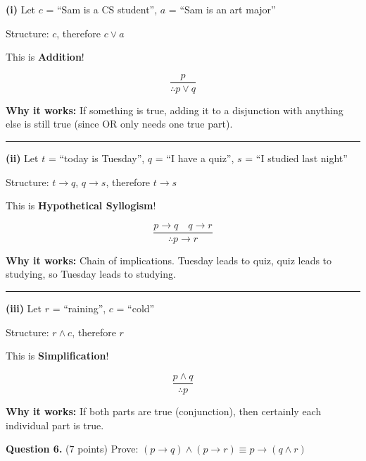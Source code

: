 \documentclass[11pt,a4paper]{article}
\begin{document}
\begin{solnbox}
\textbf{(i)} Let $c$ = ``Sam is a CS student'', $a$ = ``Sam is an art major''

Structure: $c$, therefore $c \lor a$

This is \textbf{Addition}!

$$\frac{p}{\therefore p \lor q}$$

\textbf{Why it works:} If something is true, adding it to a disjunction with anything else is still true (since OR only needs one true part).

\rule{\linewidth}{0.3pt}

\textbf{(ii)} Let $t$ = ``today is Tuesday'', $q$ = ``I have a quiz'', $s$ = ``I studied last night''

Structure: $t \to q$, $q \to s$, therefore $t \to s$

This is \textbf{Hypothetical Syllogism}!

$$\frac{p \to q \quad q \to r}{\therefore p \to r}$$

\textbf{Why it works:} Chain of implications. Tuesday leads to quiz, quiz leads to studying, so Tuesday leads to studying.

\rule{\linewidth}{0.3pt}

\textbf{(iii)} Let $r$ = ``raining'', $c$ = ``cold''

Structure: $r \land c$, therefore $r$

This is \textbf{Simplification}!

$$\frac{p \land q}{\therefore p}$$

\textbf{Why it works:} If both parts are true (conjunction), then certainly each individual part is true.
\end{solnbox}

\vspace{15pt}

\textbf{Question 6.} (7 points) Prove: $(p \to q) \land (p \to r) \equiv p \to (q \land r)$
\end{document}
